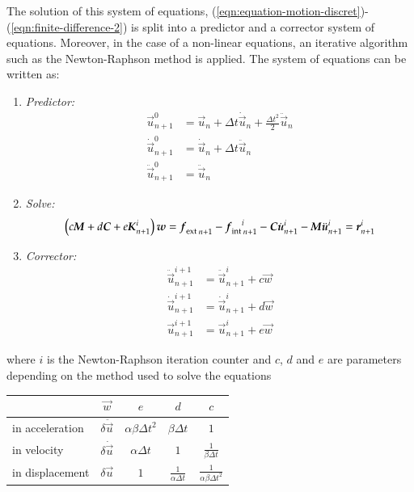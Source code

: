 The solution of this system of equations,
(\ref{eqn:equation-motion-discret})-(\ref{eqn:finite-difference-2}) is
split into a predictor and a corrector system of equations.  Moreover,
in the case of a non-linear equations, an iterative algorithm such as
the Newton-Raphson method is applied. The system of equations can be
written as:

\begin{enumerate}
\item \textit{Predictor:}
\begin{align}
  \vec{u}_{n+1}^{0} &= \vec{u}_{n} + \Delta t
  \dot{\vec{u}}_{n} + \frac{\Delta t^2}{2} \ddot{\vec{u}}_{n} \\
  \dot{\vec{u}}_{n+1}^{0} &= \dot{\vec{u}}_{n} + \Delta t
  \ddot{\vec{u}}_{n} \\
  \ddot{\vec{u}}_{n+1}^{0} &= \ddot{\vec{u}}_{n}
\end{align}

\item \textit{Solve:}
\begin{align}
  \left(c \boldsymbol{M} + d \boldsymbol{C} + e \boldsymbol{K}_{n+1}^i\right)
  \boldsymbol{w} = {\boldsymbol{f}_{{\mathrm{ext}}}}_{\,n+1} - {\boldsymbol{f}_{{\mathrm{int}}}}_{\,n+1}^i -
  \boldsymbol{C} \dot{\boldsymbol{u}}_{n+1}^i - \boldsymbol{M} \ddot{\boldsymbol{u}}_{n+1}^i = \boldsymbol{r}_{n+1}^i
\end{align}

\item \textit{Corrector:}
\begin{align}
  \ddot{\vec{u}}_{n+1}^{i+1} &= \ddot{\vec{u}}_{n+1}^{i} +c \vec{w} \\
  \dot{\vec{u}}_{n+1}^{i+1} &= \dot{\vec{u}}_{n+1}^{i} + d\vec{w} \\
  \vec{u}_{n+1}^{i+1} &= \vec{u}_{n+1}^{i} + e \vec{w}
\end{align}
\end{enumerate}

where $i$ is the Newton-Raphson iteration counter and $c$, $d$ and $e$
are parameters depending on the method used to solve the equations

\begin{center}
  \begin{tabular}{lcccc}
    \toprule
    & $\vec{w}$ & $e$ & $d$ & $c$\\
    \midrule
    in acceleration &$ \delta\ddot{\vec{u}}$ & $\alpha \beta\Delta t^2$ &$\beta \Delta t$ &$1$\\
    in velocity & $ \delta\dot{\vec{u}}$& $\alpha\Delta t$ & $1$ & $\frac{1}{\beta \Delta t}$\\
    in displacement &$\delta\vec{u}$ & $ 1$ & $\frac{1}{\alpha \Delta t}$ & $\frac{1}{\alpha \beta \Delta t^2}$\\
    \bottomrule
  \end{tabular}
\end{center}


